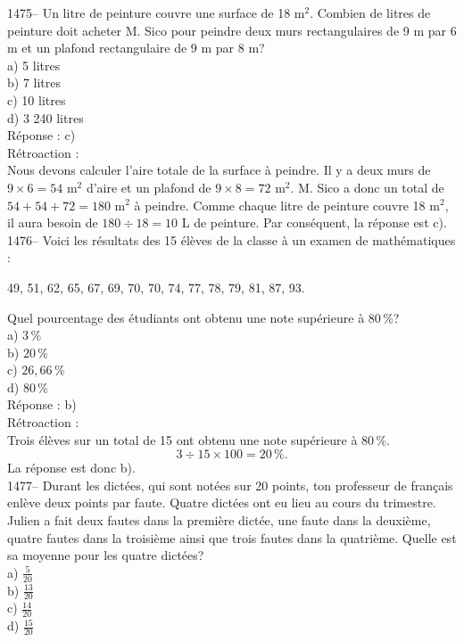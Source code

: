 1475-- Un litre de peinture couvre une surface de 18 m$^2$. Combien de
litres de peinture doit acheter M. Sico pour peindre deux murs
rectangulaires de 9 m par 6 m et un plafond
rectangulaire de 9 m par 8 m?\\
a) 5 litres \\
b) 7 litres\\
c) 10 litres\\
d) 3 240 litres\\

R\'eponse : c)\\

R\'etroaction :\\
Nous devons calculer l'aire totale de la surface \`a peindre. Il y a
deux murs de $9\times6=54$ m$^{2}$ d'aire et un plafond de
$9\times8=72$ m$^{2}$. M. Sico a donc un total de $54+54+72=180$
m$^{2}$ \`a peindre. Comme chaque litre de peinture couvre 18 m$^2$,
il aura besoin de $180\div18=10$
L de peinture. Par cons\'equent, la r\'eponse est c).\\

1476-- Voici les r\'esultats des 15 \'el\`eves de la classe \`a un
examen de math\'ematiques :
\begin{center}
49, 51, 62, 65, 67, 69, 70, 70, 74, 77, 78, 79, 81, 87, 93.
\end{center}
Quel pourcentage des \'etudiants ont obtenu une note sup\'erieure
\`a 80\,\%?\\
a) $3\,\%$\\
b) $20\,\%$\\
c) $26,66\,\%$\\
d) $80\,\%$\\

R\'eponse : b)\\

R\'etroaction :\\
Trois \'el\`eves sur un total de 15 ont obtenu une note
sup\'erieure \`a 80\,\%. \\$$3\div15\times100=20\,\%.$$ La r\'eponse est
donc b).\\

1477-- Durant les dict\'ees, qui sont not\'ees sur 20 points, ton
professeur de fran\c cais enl\`eve deux points par faute. Quatre
dict\'ees ont eu lieu au cours du trimestre. Julien a fait deux
fautes dans la premi\`ere dict\'ee, une faute dans la deuxi\`eme,
quatre fautes dans la troisi\`eme ainsi que trois fautes dans la
quatri\`eme. Quelle est sa moyenne pour les quatre dict\'ees?\\
a) $\frac{5}{20}$\\[3mm]
b) $\frac{13}{20}$\\[3mm]
c) $\frac{14}{20}$\\[3mm]
d) $\frac{15}{20}$\\

